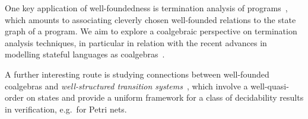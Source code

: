 \documentclass[a4paper,UKenglish, autoref, numberwithinsect, final]{lipics-v2021}
\numberwithin{equation}{section}
\theoremstyle{plain}
\theoremstyle{definition}
\begin{document}
One key application of well-foundedness is termination analysis of programs~\cite{cpr11}, which amounts to associating cleverly chosen well-founded relations to the state graph of a program. We aim to explore a coalgebraic perspective on termination analysis techniques, in particular in relation with the recent advances in modelling stateful languages as coalgebras~\cite{gmstu25}. 

A further interesting route is studying connections between well-founded coalgebras and \emph{well-structured transition systems}~\cite{fs01}, which involve a well-quasi-order on states and provide a uniform framework for a class of decidability results in verification, e.g.~for Petri nets.

%
%
%
%
%
%
%
%
%
%
%
%
%
%
%
%
%
%
%
%
%
%
%
%
%
%
%
%
%
%
%
%
%
%
%
%
%
%
%
%
%
%
%
%
%
%
%
%
%
%
%
%
%
%
%
%
%
%
%
%
%
%
%
%
%
%
%
%
%
%
%
%
%
%
%
%
%
%
%
%
%
%
%
%
%
%
%
%
%
%
%
%
%
%
%
%
%
%
%
%
%
%
%
%
%
%
%
%
%
%
%
%
%
%


\label{maintextend}


\clearpage
\appendix
{}
\end{document}
